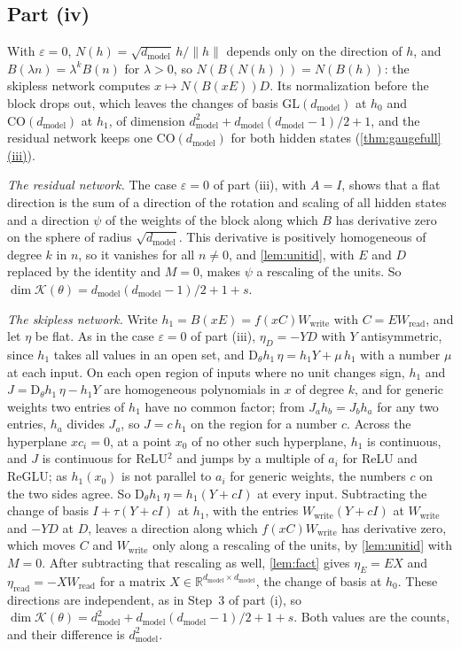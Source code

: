 \documentclass[10pt]{article}
\theoremstyle{definition}
\theoremstyle{remark}
\newcommand{\R}{\mathbb{R}}
\newcommand{\Wread}{W_{\mathrm{read}}}
\newcommand{\Wwrite}{W_{\mathrm{write}}}
\newcommand{\dm}{d_{\mathrm{model}}}
\newcommand{\GL}{\mathrm{GL}}
\newcommand{\CO}{\mathrm{CO}}
\newcommand{\Der}{\mathrm{D}}
\newcommand{\norm}[1]{\lVert #1\rVert}
\DeclareRobustCommand{\cpref}[2]{\hyperref[#1:#2]{\cref*{#1}(#2)}}
\begin{document}
\subsection*{Part (iv)}

With $\varepsilon = 0$, $N(h) = \sqrt{\dm}\,h/\norm{h}$ depends only on the direction of $h$, and $B(\lambda n) = \lambda^kB(n)$ for $\lambda > 0$, so $N(B(N(h))) = N(B(h))$: the skipless network computes $x \mapsto N(B(xE))D$. Its normalization before the block drops out, which leaves the changes of basis $\GL(\dm)$ at $h_0$ and $\CO(\dm)$ at $h_1$, of dimension $\dm^2 + \dm(\dm-1)/2 + 1$, and the residual network keeps one $\CO(\dm)$ for both hidden states (\cpref{thm:gaugefull}{iii}).

\emph{The residual network.} The case $\varepsilon = 0$ of part (iii), with $A = I$, shows that a flat direction is the sum of a direction of the rotation and scaling of all hidden states and a direction $\psi$ of the weights of the block along which $B$ has derivative zero on the sphere of radius $\sqrt{\dm}$. This derivative is positively homogeneous of degree $k$ in $n$, so it vanishes for all $n \neq 0$, and \cref{lem:unitid}, with $E$ and $D$ replaced by the identity and $M = 0$, makes $\psi$ a rescaling of the units. So $\dim\mathcal K(\theta) = \dm(\dm-1)/2 + 1 + s$.

\emph{The skipless network.} Write $h_1 = B(xE) = f(xC)\Wwrite$ with $C = E\Wread$, and let $\eta$ be flat. As in the case $\varepsilon = 0$ of part (iii), $\eta_D = -YD$ with $Y$ antisymmetric, since $h_1$ takes all values in an open set, and $\Der_\theta h_1\,\eta = h_1Y + \mu\,h_1$ with a number $\mu$ at each input. On each open region of inputs where no unit changes sign, $h_1$ and $J = \Der_\theta h_1\,\eta - h_1Y$ are homogeneous polynomials in $x$ of degree $k$, and for generic weights two entries of $h_1$ have no common factor; from $J_ah_b = J_bh_a$ for any two entries, $h_a$ divides $J_a$, so $J = c\,h_1$ on the region for a number $c$. Across the hyperplane $xc_i = 0$, at a point $x_0$ of no other such hyperplane, $h_1$ is continuous, and $J$ is continuous for ReLU$^2$ and jumps by a multiple of $a_i$ for ReLU and ReGLU; as $h_1(x_0)$ is not parallel to $a_i$ for generic weights, the numbers $c$ on the two sides agree. So $\Der_\theta h_1\,\eta = h_1(Y + cI)$ at every input. Subtracting the change of basis $I + \tau(Y + cI)$ at $h_1$, with the entries $\Wwrite(Y + cI)$ at $\Wwrite$ and $-YD$ at $D$, leaves a direction along which $f(xC)\Wwrite$ has derivative zero, which moves $C$ and $\Wwrite$ only along a rescaling of the units, by \cref{lem:unitid} with $M = 0$. After subtracting that rescaling as well, \cref{lem:fact} gives $\eta_E = EX$ and $\eta_{\mathrm{read}} = -X\Wread$ for a matrix $X \in \R^{\dm\times\dm}$, the change of basis at $h_0$. These directions are independent, as in Step~3 of part (i), so $\dim\mathcal K(\theta) = \dm^2 + \dm(\dm-1)/2 + 1 + s$. Both values are the counts, and their difference is $\dm^2$.
\end{document}
